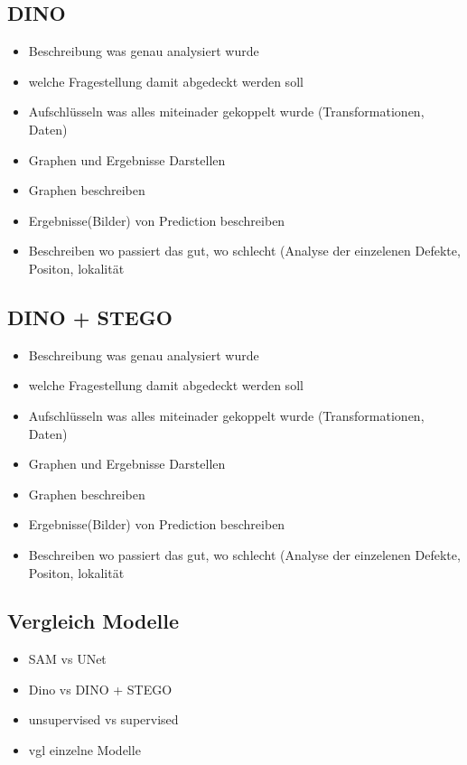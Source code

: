 \subsection{DINO}
    \begin{itemize}
        \item Beschreibung was genau analysiert wurde
        \item welche Fragestellung damit abgedeckt werden soll
        \item Aufschlüsseln was alles miteinader gekoppelt wurde (Transformationen, Daten)
        \item Graphen und Ergebnisse Darstellen 
        \item Graphen beschreiben
        \item Ergebnisse(Bilder) von Prediction beschreiben
        \item Beschreiben wo passiert das gut, wo schlecht (Analyse der einzelenen Defekte, Positon, lokalität
    \end{itemize}

\subsection{DINO + STEGO}
    \begin{itemize}
        \item Beschreibung was genau analysiert wurde
        \item welche Fragestellung damit abgedeckt werden soll
        \item Aufschlüsseln was alles miteinader gekoppelt wurde (Transformationen, Daten)
        \item Graphen und Ergebnisse Darstellen 
        \item Graphen beschreiben
        \item Ergebnisse(Bilder) von Prediction beschreiben
        \item Beschreiben wo passiert das gut, wo schlecht (Analyse der einzelenen Defekte, Positon, lokalität
    \end{itemize}

\subsection{Vergleich Modelle}
    \begin{itemize}
        \item SAM vs UNet
        \item Dino vs DINO + STEGO
        \item unsupervised vs supervised   
        \item vgl einzelne Modelle  
    \end{itemize}
